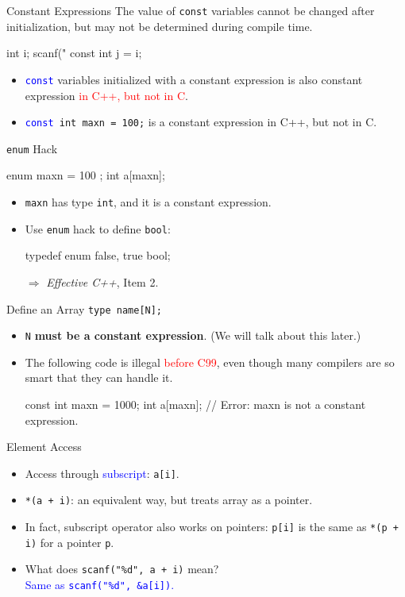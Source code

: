 \documentclass[handout]{beamer}
\newcommand{\red}[1]{\textcolor{red}{#1}}
\newcommand{\blue}[1]{\textcolor{blue}{#1}}
\newcommand{\ttt}[1]{\texttt{#1}}
\newcommand{\bluett}[1]{\blue{\ttt{#1}}}
\begin{document}
\begin{frame}[fragile]{Constant Expressions}
	The value of \ttt{const} variables cannot be changed after initialization, but may not be determined during compile time.
	\begin{cpp}
int i;
scanf("%
const int j = i;
	\end{cpp}
	\pause
	\begin{itemize}
		\item \bluett{const} variables initialized with a constant expression is also constant expression \red{in C++, but not in C}.
		\item \bluett{const }\ttt{int maxn = 100;} is a constant expression in C++, but not in C.
	\end{itemize}
\end{frame}

\begin{frame}[fragile]{\ttt{enum} Hack}
	\begin{cpp}
enum { maxn = 100 };
int a[maxn];
	\end{cpp}
	\begin{itemize}
		\item \ttt{maxn} has type \ttt{int}, and it is a constant expression.
		\pause
		\item Use \ttt{enum} hack to define \ttt{bool}:
		\begin{cpp}
typedef enum { false, true } bool;
		\end{cpp}
		\item[\(\Rightarrow\)] \textit{Effective C++}, Item 2.
	\end{itemize}
\end{frame}

\begin{frame}[fragile]{Define an Array}
	\ttt{type name[N];}
	\begin{itemize}
		\item \ttt{N} \textbf{must be a constant expression}. (We will talk about this later.)
		\item The following code is illegal \red{before C99}, even though many compilers are so smart that they can handle it.
		\begin{cpp}
const int maxn = 1000;
int a[maxn]; // Error: maxn is not a constant expression.
		\end{cpp}
	\end{itemize}
\end{frame}

\begin{frame}{Element Access}
	\begin{itemize}
		\item Access through \blue{subscript}: \ttt{a[i]}.
		\pause
		\item \ttt{*(a + i)}: an equivalent way, but treats array as a pointer.
		\item In fact, subscript operator also works on pointers: \ttt{p[i]} is the same as \ttt{*(p + i)} for a pointer \ttt{p}.
		\pause
		\item What does \ttt{scanf("\%d", a + i)} mean?\\
		\pause
		\blue{Same as \ttt{scanf("\%d", \&a[i])}.}
	\end{itemize}
\end{frame}
\end{document}
